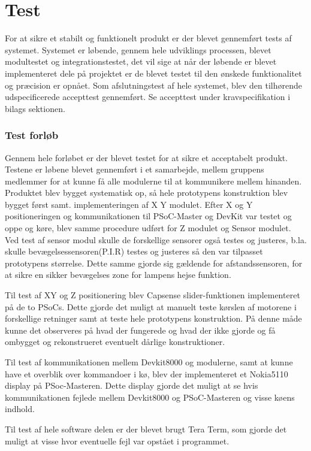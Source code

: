 \section{Test}

For at sikre et stabilt og funktionelt produkt er der blevet gennemført tests af systemet. Systemet er løbende, gennem hele udviklings processen, blevet modultestet og integrationstestet, det vil sige at når der løbende er blevet implementeret dele på projektet er de blevet testet til den ønskede funktionalitet og præcision er opnået. Som afslutningstest af hele systemet, blev den tilhørende udspecificerede accepttest gennemført. Se accepttest under kravspecifikation i bilags sektionen. 

\subsubsection{Test forløb}
Gennem hele forløbet er der blevet testet for at sikre et acceptabelt produkt. Testene er løbene blevet gennemført i et samarbejde, mellem gruppens medlemmer for at kunne få alle modulerne til at kommunikere mellem hinanden. Produktet blev bygget systematisk op, så hele prototypens konstruktion blev bygget først samt. implementeringen af X Y modulet. Efter X og Y positioneringen og kommunikationen til PSoC-Master og DevKit var testet og oppe og køre, blev samme procedure udført for Z modulet og Sensor modulet. Ved test af sensor modul skulle de forskellige sensorer også testes og justeres, b.la. skulle bevægelsessensoren(P.I.R) testes og justeres så den var tilpasset prototypens størrelse. Dette samme gjorde sig gældende for afstandssensoren, for at sikre en sikker bevægelses zone for lampens hejse funktion.

Til test af XY og Z positionering blev Capsense slider-funktionen implementeret på de to PSoCs. Dette gjorde det muligt at manuelt teste kørslen af motorene i forskellige retninger samt at teste hele prototypens konstruktion. På denne måde kunne det observeres på hvad der fungerede og hvad der ikke gjorde og få ombygget og rekonstrueret eventuelt dårlige konstruktioner.

Til test af kommunikationen mellem Devkit8000 og modulerne, samt at kunne have et overblik over kommandoer i kø, blev der implementeret et Nokia5110 display på PSoc-Masteren. Dette display gjorde det muligt at se hvis kommunikationen fejlede mellem Devkit8000 og PSoC-Masteren og visse køens indhold.

Til test af hele software delen er der blevet brugt Tera Term, som gjorde det muligt at visse hvor eventuelle fejl var opstået i programmet. %

